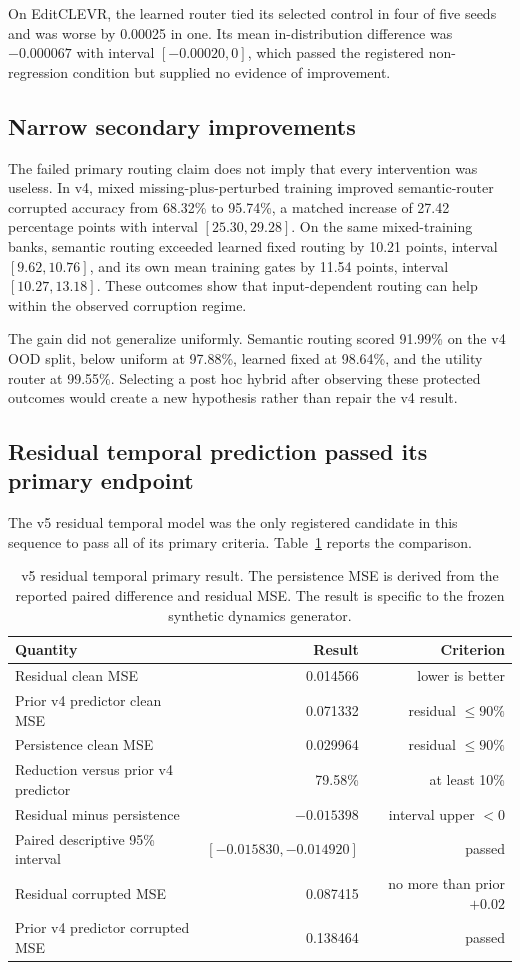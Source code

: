 \documentclass[10pt]{article}
\begin{document}
On EditCLEVR, the learned router tied its selected control in four of five seeds and was
worse by 0.00025 in one. Its mean in-distribution difference was $-0.000067$ with interval
$[-0.00020,0]$, which passed the registered non-regression condition but supplied no
evidence of improvement.

\subsection{Narrow secondary improvements}
The failed primary routing claim does not imply that every intervention was useless. In
v4, mixed missing-plus-perturbed training improved semantic-router corrupted accuracy from
68.32\% to 95.74\%, a matched increase of 27.42 percentage points with interval
$[25.30,29.28]$. On the same mixed-training banks, semantic routing exceeded learned fixed
routing by 10.21 points, interval $[9.62,10.76]$, and its own mean training gates by 11.54
points, interval $[10.27,13.18]$. These outcomes show that input-dependent routing can help
within the observed corruption regime.

The gain did not generalize uniformly. Semantic routing scored 91.99\% on the v4 OOD split,
below uniform at 97.88\%, learned fixed at 98.64\%, and the utility router at 99.55\%.
Selecting a post hoc hybrid after observing these protected outcomes would create a new
hypothesis rather than repair the v4 result.

\subsection{Residual temporal prediction passed its primary endpoint}
The v5 residual temporal model was the only registered candidate in this sequence to pass
all of its primary criteria. Table~\ref{tab:temporal} reports the comparison.

\begin{table}[H]
\centering
\small
\begin{tabular}{lrr}
\toprule
Quantity & Result & Criterion \\
\midrule
Residual clean MSE & 0.014566 & lower is better \\
Prior v4 predictor clean MSE & 0.071332 & residual $\leq 90\%$ \\
Persistence clean MSE & 0.029964 & residual $\leq 90\%$ \\
Reduction versus prior v4 predictor & 79.58\% & at least 10\% \\
Residual minus persistence & $-0.015398$ & interval upper $<0$ \\
Paired descriptive 95\% interval & $[-0.015830,-0.014920]$ & passed \\
Residual corrupted MSE & 0.087415 & no more than prior $+0.02$ \\
Prior v4 predictor corrupted MSE & 0.138464 & passed \\
\bottomrule
\end{tabular}
\caption{v5 residual temporal primary result. The persistence MSE is derived from the
reported paired difference and residual MSE. The result is specific to the frozen synthetic
dynamics generator.}
\label{tab:temporal}
\end{table}
\end{document}
